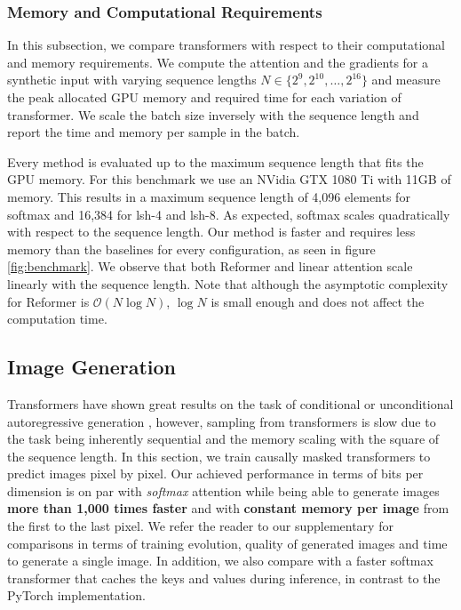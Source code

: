 \documentclass{article}
\newcommand{\bigO}[1]{\mathcal{O}\left(#1\right)}
\begin{document}
\subsubsection{Memory and Computational Requirements}

In this subsection, we compare transformers with respect to their computational
and memory requirements. We compute the attention and the gradients for a
synthetic input with varying sequence lengths $N \in \{2^9, 2^{10}, \dots,
2^{16}\}$ and measure the peak allocated GPU memory and required time for each
variation of transformer.
We scale the batch size inversely with the sequence length and
report the time and memory per sample in the batch.

Every method is evaluated up to the maximum sequence length that fits the GPU
memory. For this benchmark we use an NVidia GTX 1080 Ti with 11GB of memory.
This results in a maximum sequence length of 4,096 elements for softmax and
16,384 for lsh-4 and lsh-8. As expected, softmax scales quadratically with
respect to the sequence length.  Our method is faster and requires less memory
than the baselines for every configuration, as seen in figure
\ref{fig:benchmark}.  We observe that both Reformer and linear attention scale
linearly with the sequence length. Note that although the asymptotic complexity
for Reformer is $\bigO{N \log N}$, $\log N$ is small enough and does not affect
the computation time.

\subsection{Image Generation} \label{sec:image}

Transformers
have shown great results on the task of conditional or unconditional
autoregressive generation \cite{radford2019language, child2019generating},
however, sampling from transformers is slow due to the task being inherently
sequential and the memory scaling with the square of the sequence length.
In this section, we train causally masked transformers to predict images
pixel by pixel. Our achieved performance in terms of bits
per dimension is on par with \emph{softmax} attention while being able to generate
images \textbf{more than 1,000 times faster} and with \textbf{constant memory
per image} from the first to the last pixel. We refer the reader to our
supplementary for comparisons in terms of training evolution, quality of
generated images and time to generate a single image. In addition, we also
compare with a faster softmax transformer that caches the keys and values
during inference, in contrast to the PyTorch implementation.
\end{document}

